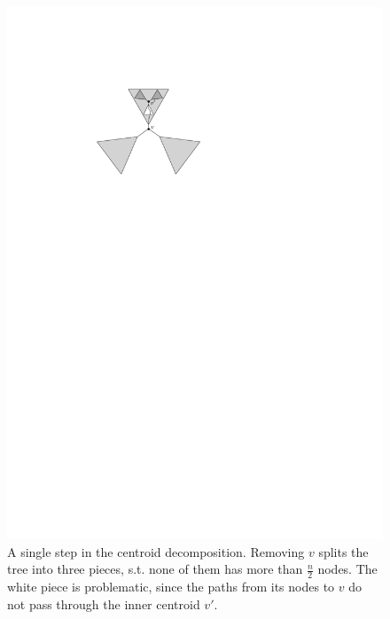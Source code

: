 \documentclass[11pt,a4paper]{article}
\theoremstyle{definition}
\theoremstyle{remark}
\begin{document}
\begin{figure}
\begin{center}
\includegraphics[scale=1]{centroid}
\end{center}
\caption{A single step in the centroid decomposition. Removing $v$ splits the tree into three pieces, s.t. none of them has more than $\frac{n}{2}$ nodes. The white piece is problematic, since the paths from its nodes to $v$ do not pass through the inner centroid $v'$.}
\end{figure}
\end{document}
